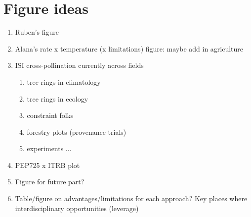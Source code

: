 \documentclass[11pt,letter]{article}
\begin{document}
\section{Figure ideas}

\begin{enumerate}
\item Ruben's figure
\item Alana's rate x temperature (x limitations) figure: maybe add in agriculture
\item ISI cross-pollination currently across fields
\begin{enumerate}
\item tree rings in climatology
\item tree rings in ecology
\item constraint folks
\item forestry plots (provenance trials)
\item experiments ... 
\end{enumerate}
\item PEP725 x ITRB plot
\item Figure for future part?
\item Table/figure on advantages/limitations for each approach? Key places where interdisciplinary opportunities (leverage)
\end{enumerate}
\end{document}
